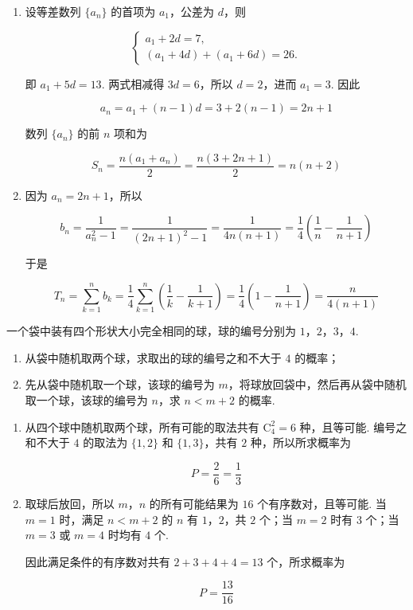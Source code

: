 \begin{solution}
\begin{enumerate}
\item 设等差数列 \(\{a_n\}\) 的首项为 \(a_1\)，公差为 \(d\)，则

\[
\begin{cases}
a_1+2d=7,\\
(a_1+4d)+(a_1+6d)=26.
\end{cases}
\]

即 \(a_1+5d=13\). 两式相减得 \(3d=6\)，所以 \(d=2\)，进而 \(a_1=3\). 因此

\[
a_n=a_1+(n-1)d=3+2(n-1)=2n+1
\]

数列 \(\{a_n\}\) 的前 \(n\) 项和为

\[
S_n=\frac{n(a_1+a_n)}{2}=\frac{n(3+2n+1)}{2}=n(n+2)
\]

\item 因为 \(a_n=2n+1\)，所以

\[
b_n=\frac{1}{a_n^2-1}=\frac{1}{(2n+1)^2-1}=\frac{1}{4n(n+1)}=\frac{1}{4}\left(\frac{1}{n}-\frac{1}{n+1}\right)
\]

于是

\[
T_n=\sum_{k=1}^{n}b_k=\frac{1}{4}\sum_{k=1}^{n}\left(\frac{1}{k}-\frac{1}{k+1}\right)=\frac{1}{4}\left(1-\frac{1}{n+1}\right)=\frac{n}{4(n+1)}
\]
\end{enumerate}
\end{solution}

\begin{problem}
一个袋中装有四个形状大小完全相同的球，球的编号分别为 \(1\)，\(2\)，\(3\)，\(4\).

\begin{enumerate}
\item 从袋中随机取两个球，求取出的球的编号之和不大于 \(4\) 的概率；
\item 先从袋中随机取一个球，该球的编号为 \(m\)，将球放回袋中，然后再从袋中随机取一个球，该球的编号为 \(n\)，求 \(n < m + 2\) 的概率.
\end{enumerate}
\end{problem}

\begin{solution}
\begin{enumerate}
\item 从四个球中随机取两个球，所有可能的取法共有 \(\mathrm C_4^2=6\) 种，且等可能. 编号之和不大于 \(4\) 的取法为 \(\{1,2\}\) 和 \(\{1,3\}\)，共有 \(2\) 种，所以所求概率为

\[
P=\frac{2}{6}=\frac{1}{3}
\]

\item 取球后放回，所以 \(m\)，\(n\) 的所有可能结果为 \(16\) 个有序数对，且等可能. 当 \(m=1\) 时，满足 \(n<m+2\) 的 \(n\) 有 \(1\)，\(2\)，共 \(2\) 个；当 \(m=2\) 时有 \(3\) 个；当 \(m=3\) 或 \(m=4\) 时均有 \(4\) 个.

因此满足条件的有序数对共有 \(2+3+4+4=13\) 个，所求概率为

\[
P=\frac{13}{16}
\]
\end{enumerate}
\end{solution}

